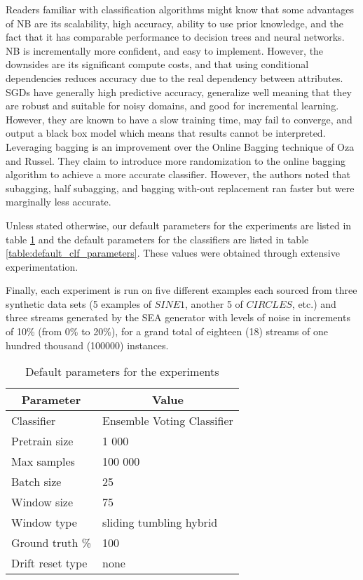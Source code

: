 Readers familiar with classification algorithms might know that some advantages of NB are its scalability, high accuracy, ability to use prior knowledge, and the fact that it has comparable performance to decision trees and neural networks. NB is incrementally more confident, and easy to implement. However, the downsides are its significant compute costs, and that using conditional dependencies reduces accuracy due to the real dependency between attributes.
SGDs have generally high predictive accuracy, generalize well meaning that they are robust and suitable for noisy domains, and good for incremental learning. However, they are known to have a slow training time, may fail to converge, and output a black box model which means that results cannot be interpreted.
Leveraging bagging \cite{bifet2010leveraging} is an improvement over the Online Bagging technique of Oza and Russel. They claim to introduce more randomization to the online bagging algorithm to achieve a more accurate classifier. However, the authors noted that subagging, half subagging, and bagging with-out replacement ran faster but were marginally less accurate.

Unless stated otherwise, our default parameters for the experiments are listed in table \ref{table:default_exp_parameters} and the default parameters for the classifiers are listed in table \ref{table:default_clf_parameters}. These values were obtained through extensive experimentation.

Finally, each experiment is run on five different examples each sourced from three synthetic data sets (5 examples of $SINE1$, another 5 of $CIRCLES$, etc.) and three streams generated by the SEA generator with levels of noise in increments of 10\% (from 0\% to 20\%), for a grand total of eighteen (18) streams of one hundred thousand (100000) instances.

\begin{table}[]
\centering
\caption{\label{table:default_exp_parameters}Default parameters for the experiments}
\begin{tabular}{|l|l|}
\hline
\multicolumn{1}{|c|}{\textbf{Parameter}} & \multicolumn{1}{c|}{\textbf{Value}} \\ \hline \hhline{==}
Classifier & Ensemble Voting Classifier \\ \hline
Pretrain size & 1 000 \\ \hline
Max samples & 100 000 \\ \hline
Batch size & 25 \\ \hline
Window size & 75 \\ \hline
Window type & sliding tumbling hybrid \\ \hline
Ground truth \% & 100 \\ \hline
Drift reset type & none \\ \hline
\end{tabular}
\end{table}

